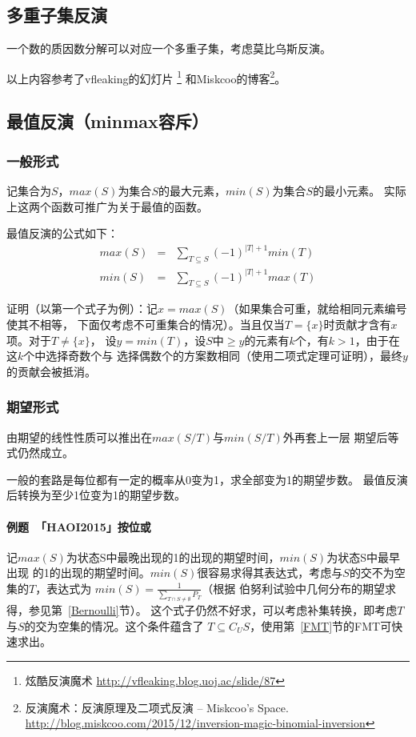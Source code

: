 \subsection{多重子集反演}
一个数的质因数分解可以对应一个多重子集，考虑莫比乌斯反演。

以上内容参考了vfleaking的幻灯片
\footnote{炫酷反演魔术 \url{http://vfleaking.blog.uoj.ac/slide/87}}
和Miskcoo的博客\footnote{反演魔术：反演原理及二项式反演 – Miskcoo's Space.
	\url{http://blog.miskcoo.com/2015/12/inversion-magic-binomial-inversion}
}。
\subsection{最值反演（minmax容斥）}
\subsubsection{一般形式}
记集合为$S$，$max(S)$为集合$S$的最大元素，$min(S)$为集合$S$的最小元素。
实际上这两个函数可推广为关于最值的函数。

最值反演的公式如下：
\begin{eqnarray*}
	max(S)&=&\sum_{T\subseteq S}{(-1)^{|T|+1}min(T)}\\
	min(S)&=&\sum_{T\subseteq S}{(-1)^{|T|+1}max(T)}
\end{eqnarray*}

证明（以第一个式子为例）：记$x=max(S)$（如果集合可重，就给相同元素编号使其不相等，
下面仅考虑不可重集合的情况）。当且仅当$T=\{x\}$时贡献才含有$x$项。对于$T\neq \{x\}$，
设$y=min(T)$，设$S$中$\geq y$的元素有$k$个，有$k>1$，由于在这$k$个中选择奇数个与
选择偶数个的方案数相同（使用二项式定理可证明），最终$y$的贡献会被抵消。

\subsubsection{期望形式}
由期望的线性性质可以推出在$max(S/T)$与$min(S/T)$外再套上一层
期望后等式仍然成立。

一般的套路是每位都有一定的概率从0变为1，求全部变为1的期望步数。
最值反演后转换为至少1位变为1的期望步数。

\paragraph{例题~「HAOI2015」按位或}
记$max(S)$为状态S中最晚出现的1的出现的期望时间，$min(S)$为状态S中最早出现
的1的出现的期望时间。$min(S)$很容易求得其表达式，考虑与$S$的交不为空集的$T$，表达式为
$min(S)=\frac{1}{\displaystyle \sum_{T\cap S \neq \emptyset}{P_T}}$（根据
伯努利试验中几何分布的期望求得，参见第~\ref{Bernoulli}节）。
这个式子仍然不好求，可以考虑补集转换，即考虑$T$与$S$的交为空集的情况。这个条件蕴含了
$T\subseteq C_US$，使用第~\ref{FMT}节的FMT可快速求出。

